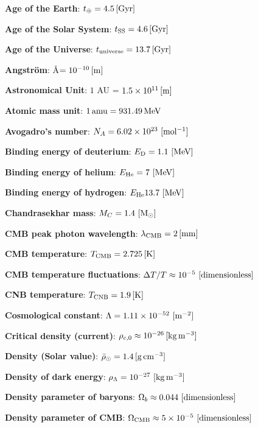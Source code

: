 \documentclass[a4paper,10pt]{article}
\begin{document}
{\noindent}\textbf{Age of the Earth}: $t_\oplus = 4.5\,[{\rm Gyr}]$

{\noindent}\textbf{Age of the Solar System}: $t_\mathrm{SS} = 4.6\,[{\rm Gyr}]$

{\noindent}\textbf{Age of the Universe}: $t_\mathrm{universe} = 13.7\,[{\rm Gyr}]$

{\noindent}\textbf{Angstr\"{o}m}: \AA$ = 10^{-10}\,[{\rm m}]$

{\noindent}\textbf{Astronomical Unit}: $1$ AU = $1.5\times10^{11}\,[{\rm m}]$

{\noindent}\textbf{Atomic mass unit}: $1\,{\rm amu} = 931.49\,{\rm MeV}$

{\noindent}\textbf{Avogadro's number}: $N_A=6.02\times10^{23} ~ [{\rm mol^{-1}}]$

{\noindent}\textbf{Binding energy of deuterium}: $E_\mathrm{D} = 1.1 ~ [{\rm MeV}]$

{\noindent}\textbf{Binding energy of helium}: $E_\mathrm{He} = 7 ~ [{\rm MeV}]$

{\noindent}\textbf{Binding energy of hydrogen}: $E_\mathrm{He} 13.7 ~ [{\rm MeV}]$

{\noindent}\textbf{Chandrasekhar mass}: $M_C = 1.4 ~ [{\rm M_\odot}]$

{\noindent}\textbf{CMB peak photon wavelength}: $\lambda_\mathrm{CMB} = 2\,[{\rm mm}]$

{\noindent}\textbf{CMB temperature}: $T_\mathrm{CMB} = 2.725\,[{\rm K}]$

{\noindent}\textbf{CMB temperature fluctuations}: $\Delta T/T\approx10^{-5} ~ [{\rm dimensionless}]$

{\noindent}\textbf{CNB temperature}: $T_\mathrm{CNB} = 1.9\,[{\rm K}]$

{\noindent}\textbf{Cosmological constant}: $\Lambda=1.11\times10^{-52} ~ [{\rm m^{-2}}]$

{\noindent}\textbf{Critical density (current)}: $\rho_{c,0}\approx10^{-26}\,[{\rm kg\,m^{-3}}]$

{\noindent}\textbf{Density (Solar value)}: $\bar{\rho}_\odot = 1.4\,[{\rm g\,cm^{-3}}]$

{\noindent}\textbf{Density of dark energy}: $\rho_\Lambda = 10^{-27} ~ [{\rm kg\,m^{-3}}]$

{\noindent}\textbf{Density parameter of baryons}: $\Omega_b \approx 0.044 ~ [{\rm dimensionless}]$

{\noindent}\textbf{Density parameter of CMB}: $\Omega_\mathrm{CMB} \approx 5\times10^{-5} ~ [{\rm dimensionless}]$
\end{document}
